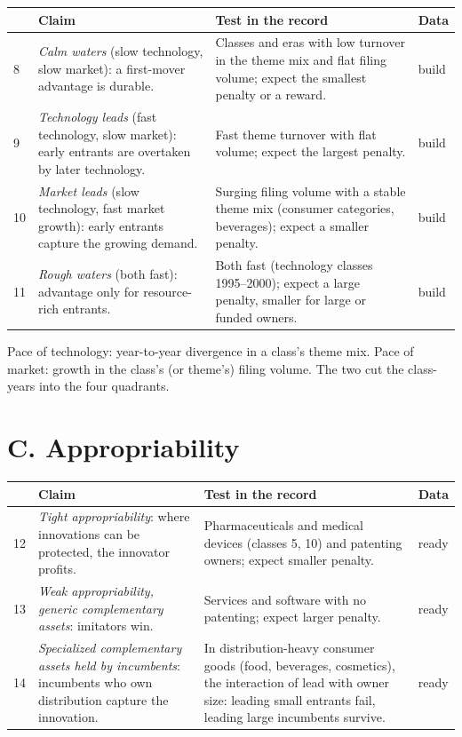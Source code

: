 \begin{longtable}{p{0.4cm}p{5.3cm}p{6.2cm}p{1.5cm}}
\toprule
& Claim & Test in the record & Data \\
\midrule
\endhead
8 & \emph{Calm waters} (slow technology, slow market): a first-mover
advantage is durable. & Classes and eras with low turnover in the
theme mix and flat filing volume; expect the smallest penalty or a
reward. & build \\
9 & \emph{Technology leads} (fast technology, slow market): early
entrants are overtaken by later technology. & Fast theme turnover with
flat volume; expect the largest penalty. & build \\
10 & \emph{Market leads} (slow technology, fast market growth): early
entrants capture the growing demand. & Surging filing volume with a
stable theme mix (consumer categories, beverages); expect a smaller
penalty. & build \\
11 & \emph{Rough waters} (both fast): advantage only for resource-rich
entrants. & Both fast (technology classes 1995--2000); expect a large
penalty, smaller for large or funded owners. & build \\
\bottomrule
\end{longtable}

\noindent Pace of technology: year-to-year divergence in a class's theme
mix. Pace of market: growth in the class's (or theme's) filing volume.
The two cut the class-years into the four quadrants.

\section*{C. Appropriability \citep{Teece1986}}

\begin{longtable}{p{0.4cm}p{5.3cm}p{6.2cm}p{1.5cm}}
\toprule
& Claim & Test in the record & Data \\
\midrule
\endhead
12 & \emph{Tight appropriability}: where innovations can be protected,
the innovator profits. & Pharmaceuticals and medical devices (classes 5,
10) and patenting owners; expect smaller penalty. & ready \\
13 & \emph{Weak appropriability, generic complementary assets}:
imitators win. & Services and software with no patenting; expect larger
penalty. & ready \\
14 & \emph{Specialized complementary assets held by incumbents}:
incumbents who own distribution capture the innovation. & In
distribution-heavy consumer goods (food, beverages, cosmetics), the
interaction of lead with owner size: leading small entrants fail,
leading large incumbents survive. & ready \\
\bottomrule
\end{longtable}

